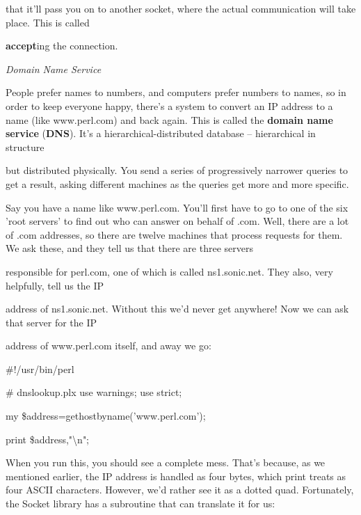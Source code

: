 \documentclass[a4paper,11pt]{book}
\begin{document}
\noindent that it'll pass you on to another socket, where the actual communication will take place. This is called

\noindent \textbf{accept}ing the connection.

\noindent 

\noindent 

\noindent \textit{Domain Name Service}

\noindent People prefer names to numbers, and computers prefer numbers to names, so in order to keep everyone happy, there's a system to convert an IP address to a name (like www.perl.com) and back again. This is called the \textbf{domain name service }(\textbf{DNS}). It's a hierarchical-distributed database -- hierarchical in structure

\noindent but distributed physically. You send a series of progressively narrower queries to get a result, asking different machines as the queries get more and more specific.

\noindent 

\noindent Say you have a name like www.perl.com. You'll first have to go to one of the six 'root servers' to find out who can answer on behalf of .com. Well, there are a lot of .com addresses, so there are twelve machines that process requests for them. We ask these, and they tell us that there are three servers

\noindent responsible for perl.com, one of which is called ns1.sonic.net. They also, very helpfully, tell us the IP

\noindent address of ns1.sonic.net. Without this we'd never get anywhere! Now we can ask that server for the IP

\noindent address of www.perl.com itself, and away we go:

\noindent 

\noindent \#!/usr/bin/perl

\noindent \# dnslookup.plx use warnings; use strict;

\noindent my \$address=gethostbyname('www.perl.com');

\noindent print \$address,"\textbackslash n";

\noindent 

\noindent When you run this, you should see a complete mess. That's because, as we mentioned earlier, the IP address is handled as four bytes, which print treats as four ASCII characters. However, we'd rather see it as a dotted quad. Fortunately, the Socket library has a subroutine that can translate it for us:
\end{document}
